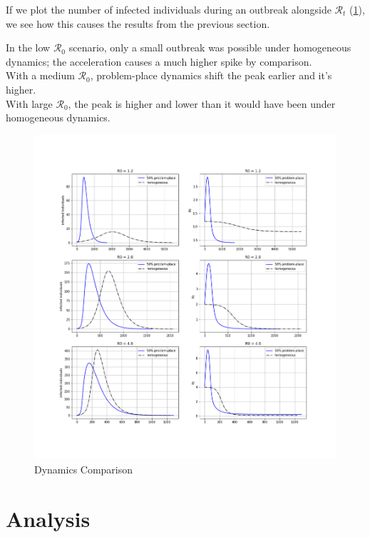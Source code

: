 \documentclass{article}
\begin{document}
If we plot the number of infected individuals during an outbreak alongside
$\mathcal{R}_t$ (\ref{fig:dynamics_comparison}), we see how this causes the
results from the previous section.

In the low $\mathcal{R}_0$ scenario, only a small outbreak was possible
under homogeneous dynamics; the acceleration causes a much higher spike by
comparison.\\

With a medium $\mathcal{R}_0$, problem-place dynamics shift the peak earlier
and it's higher.\\

With large $\mathcal{R}_0$, the peak is higher and lower than it would have
been under homogeneous dynamics.



\begin{figure}
\centering
\includegraphics[width=\textwidth]{dynamics_comparison}
\caption{Dynamics Comparison}
\label{fig:dynamics_comparison}
\end{figure}


\pagebreak
\section{Analysis} 
\end{document}
